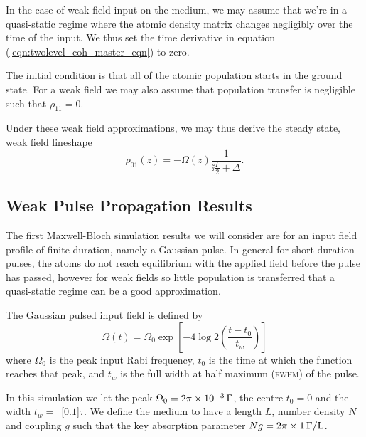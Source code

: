     In the case of weak field input on the medium, we may assume that we're in a
    quasi-static regime where the atomic density matrix changes negligibly over
    the time of the input. We thus set the time derivative in equation
    (\ref{eqn:twolevel_coh_master_eqn}) to zero.

    The initial condition is that all of the atomic population starts in the ground state. For a weak field we may also assume that population transfer is negligible such that $\rho_{11} = 0$.

    Under these weak field approximations, we may thus derive the steady state,
    weak field lineshape
    \begin{equation}\label{eqn:weak_lineshape}
      \rho_{01}(z) = -\Omega(z) \frac{1}{\ii \frac{\Gamma}{2} + \Delta}.
    \end{equation}

  \subsection{Weak Pulse Propagation Results}    

    The first Maxwell-Bloch simulation results we will consider are for an input
    field profile of finite duration, namely a Gaussian pulse. In general for
    short duration pulses, the atoms do not reach equilibrium with the applied
    field before the pulse has passed, however for weak fields so little
    population is transferred that a quasi-static regime can be a good
    approximation.

    The Gaussian pulsed input field is defined by
    \begin{equation}
      \Omega(t) = \Omega_{0} \exp \left[ -4 \log 2 \left( \frac{t - t_0}{t_w}
                              \right) \right]
    \end{equation}
    where $\Omega_{0}$ is the peak input Rabi frequency, $t_0$ is the time at
    which the function reaches that peak, and $t_w$ is the full width at half
    maximum (\textsc{fwhm}) of the pulse.

    In this simulation we let the peak $\Omega_0 =
    \unit[2\pi\times10^{-3}]{\Gamma}$, the centre $t_0 = 0$ and the width $t_w
    =$~\unit[$0.1$]{$\tau$}. We define the medium to have a length $L$, number
    density $N$ and coupling $g$ such that the key absorption parameter $Ng =
    \unit[2\pi\times1]{\Gamma /L}$.

